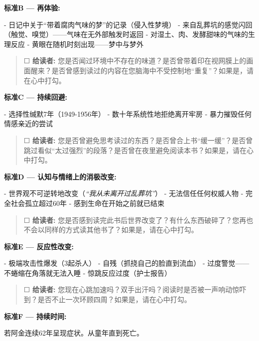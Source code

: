 \noindent \textbf{标准B --- 再体验:}

\noindent - 日记中关于\textquotedblleft{带着腐肉气味的梦\textquotedblright{}}的记录（侵入性梦境）
\noindent - 来自乱葬坑的感觉闪回（触觉、嗅觉）——气味在无外部触发时返回
\noindent - 对湿土、肉、发酵甜味的气味的生理反应
\noindent - 黄眼在随机时刻出现——梦中与梦外

\begin{quote}
☐ \textbf{给读者:} 您是否闻过环境中不存在的味道？是否曾带着印在视网膜上的画面醒来？是否曾感到读过的内容在您脑海中不受控制地\textquotedblleft{重复\textquotedblright{}}？如果是，请在心中打勾。
\end{quote}

\noindent \textbf{标准C --- 持续回避:}

\noindent - 选择性缄默7年（1949-1956年）
\noindent - 数十年系统性地拒绝离开牢房
\noindent - 暴力摧毁任何情感亲近的尝试

\begin{quote}
☐ \textbf{给读者:} 您是否曾避免思考读过的东西？是否曾合上书\textquotedblleft{缓一缓\textquotedblright{}}？是否曾跳过看似\textquotedblleft{太过强烈\textquotedblright{}}的段落？是否曾在夜里避免阅读本书？如果是，请在心中打勾。
\end{quote}

\noindent \textbf{标准D --- 认知与情绪上的消极改变:}

\noindent - 世界观不可逆转地改变（\textit{\textquotedblleft{}我从未离开过乱葬坑\textquotedblright{}}）
\noindent - 无法信任任何权威人物
\noindent - 完全社会孤立超过60年
\noindent - 感到生命在开始之前就已结束

\begin{quote}
☐ \textbf{给读者:} 您是否感到读完此书后世界改变了？有什么东西破碎了？您再也不会以同样的方式读其他书了？如果是，请在心中打勾。
\end{quote}

\noindent \textbf{标准E --- 反应性改变:}

\noindent - 极端攻击性爆发（3起杀人）
\noindent - 自残（抓挠自己的脸直到流血）
\noindent - 过度警觉——不蜷缩在角落就无法入睡
\noindent - 惊跳反应过度（护士报告）

\begin{quote}
☐ \textbf{给读者:} 您现在心跳加速吗？双手出汗吗？阅读时是否被一声响动惊吓到？是否不止一次环顾四周？如果是，请在心中打勾。
\end{quote}

\noindent \textbf{标准F --- 持续时间:}

\noindent 若阿金连续62年呈现症状。从童年直到死亡。

